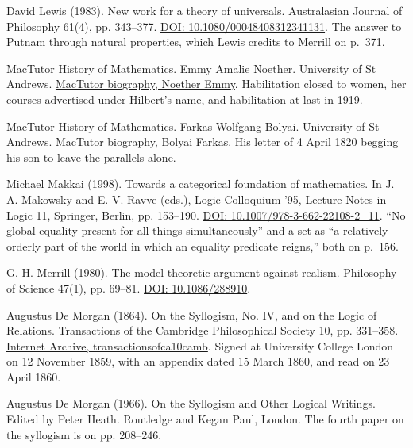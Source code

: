 \documentclass[11pt,twoside]{article}
\theoremstyle{thielethm}
\theoremstyle{thieledef}
\theoremstyle{thieledef}
\theoremstyle{thieledef}
\theoremstyle{thielethm}
\theoremstyle{thieleobs}
\theoremstyle{thielethm}
\begin{document}
\noindent David Lewis (1983). New work for a theory of universals. Australasian Journal of Philosophy 61(4), pp. 343--377. \href{https://doi.org/10.1080/00048408312341131}{DOI: 10.1080/00048408312341131}. The answer to Putnam through natural properties, which Lewis credits to Merrill on p.~371.
\par\medskip

\noindent MacTutor History of Mathematics. Emmy Amalie Noether. University of St Andrews. \href{https://mathshistory.st-andrews.ac.uk/Biographies/Noether_Emmy/}{MacTutor biography, Noether Emmy}. Habilitation closed to women, her courses advertised under Hilbert's name, and habilitation at last in 1919.
\par\medskip

\noindent MacTutor History of Mathematics. Farkas Wolfgang Bolyai. University of St Andrews. \href{https://mathshistory.st-andrews.ac.uk/Biographies/Bolyai_Farkas/}{MacTutor biography, Bolyai Farkas}. His letter of 4 April 1820 begging his son to leave the parallels alone.
\par\medskip

\noindent Michael Makkai (1998). Towards a categorical foundation of mathematics. In J. A. Makowsky and E. V. Ravve (eds.), Logic Colloquium '95, Lecture Notes in Logic 11, Springer, Berlin, pp. 153--190. \href{https://doi.org/10.1007/978-3-662-22108-2_11}{DOI: 10.1007/978-3-662-22108-2\_11}. ``No global equality present for all things simultaneously'' and a set as ``a relatively orderly part of the world in which an equality predicate reigns,'' both on p.~156.
\par\medskip

\noindent G. H. Merrill (1980). The model-theoretic argument against realism. Philosophy of Science 47(1), pp. 69--81. \href{https://doi.org/10.1086/288910}{DOI: 10.1086/288910}.
\par\medskip

\noindent Augustus De Morgan (1864). On the Syllogism, No. IV, and on the Logic of Relations. Transactions of the Cambridge Philosophical Society 10, pp. 331--358. \href{https://archive.org/details/transactionsofca10camb}{Internet Archive, transactionsofca10camb}. Signed at University College London on 12 November 1859, with an appendix dated 15 March 1860, and read on 23 April 1860.
\par\medskip

\noindent Augustus De Morgan (1966). On the Syllogism and Other Logical Writings. Edited by Peter Heath. Routledge and Kegan Paul, London. The fourth paper on the syllogism is on pp. 208--246.
\par\medskip
\end{document}

